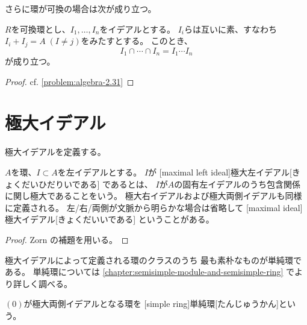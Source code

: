 \documentclass[report]{jlreq}
\begin{document}
さらに環が可換の場合は次が成り立つ。

\begin{theorem}
    $R$を可換環とし、$I_1, \dots, I_n$をイデアルとする。
    $I_i$らは互いに素、すなわち$I_i + I_j = A \; (I \neq j)$をみたすとする。
    このとき、
    \begin{equation}
        I_1 \cap \cdots \cap I_n = I_1 \cdots I_n
    \end{equation}
    が成り立つ。
\end{theorem}

\begin{proof}
    cf. \cref{problem:algebra-2.31}
\end{proof}



%
\section{極大イデアル}

極大イデアルを定義する。

\begin{definition}[極大イデアル]
    $A$を環、$I \subset A$を左イデアルとする。
    $I$が
    [maximal left ideal]{極大左イデアル}[きょくだいひだりいである]
    であるとは、
    $I$が$A$の固有左イデアルのうち包含関係に関し極大であることをいう。
    極大右イデアルおよび極大両側イデアルも同様に定義される。
    左/右/両側が文脈から明らかな場合は省略して
    [maximal ideal]{極大イデアル}[きょくだいいである]
    ということがある。
\end{definition}


\begin{proof}
    Zorn の補題を用いる。
    \TODO{}
\end{proof}

極大イデアルによって定義される環のクラスのうち
最も素朴なものが単純環である。
単純環については
\cref{chapter:semisimple-module-and-semisimple-ring}
でより詳しく調べる。

\begin{definition}[単純環]
    $(0)$が極大両側イデアルとなる環を
    [simple ring]{単純環}[たんじゅうかん]という。
\end{definition}
\end{document}
